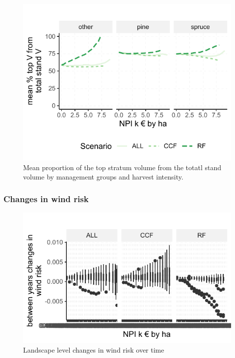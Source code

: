 \documentclass[]{elsarticle} %
\makeatletter
\def\maxwidth{\ifdim\Gin@nat@width>\linewidth\linewidth
\else\Gin@nat@width\fi}
\let\Oldincludegraphics\includegraphics
\renewcommand{\includegraphics}[1]{\Oldincludegraphics[width=\maxwidth]{#1}}
\makeatother
\begin{document}
\begin{figure}
\centering
\includegraphics{test_manus_files/figure-latex/proportion_V_stand_strat-1.pdf}
\caption{Mean proportion of the top stratum volume from the totatl stand
volume by management groups and harvest intensity.}
\end{figure}

\subsubsection{Changes in wind risk}\label{changes-in-wind-risk}

\begin{figure}
\centering
\includegraphics{test_manus_files/figure-latex/fig_windRisk_time_change-1.pdf}
\caption{Landscape level changes in wind risk over time}
\end{figure}
\end{document}

